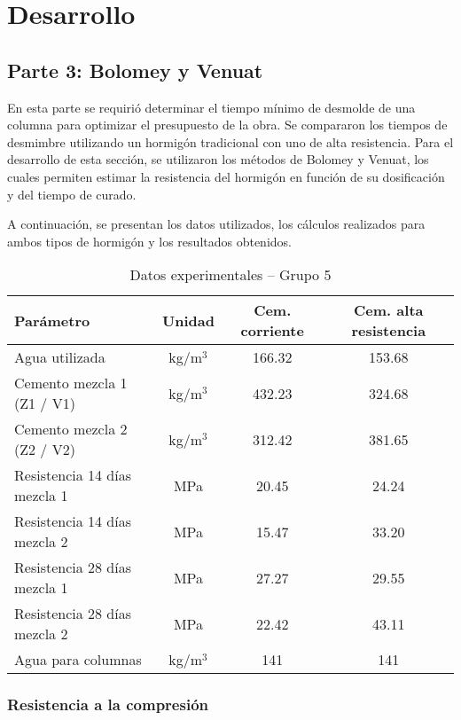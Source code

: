\section{Desarrollo}

\subsection{Parte 3: Bolomey y Venuat}

En esta parte se requirió determinar el tiempo mínimo de desmolde de una columna para optimizar el presupuesto de la obra. Se compararon los tiempos de desmimbre utilizando un hormigón tradicional con uno de alta resistencia. 
Para el desarrollo de esta sección, se utilizaron los métodos de Bolomey y Venuat, los cuales permiten estimar la resistencia del hormigón en función de su dosificación y del tiempo de curado.

A continuación, se presentan los datos utilizados, los cálculos realizados para ambos tipos de hormigón y los resultados obtenidos.

\begin{table}[H]
\centering
\caption{Datos experimentales – Grupo 5}
\renewcommand{\arraystretch}{1.15}
\small
\begin{tabular}{lccc}
\hline
\textbf{Parámetro} & \textbf{Unidad} & \textbf{Cem. corriente} & \textbf{Cem. alta resistencia} \\ \hline
Agua utilizada & kg/m$^3$ & 166.32 & 153.68 \\
Cemento mezcla 1 (Z1 / V1) & kg/m$^3$ & 432.23 & 324.68 \\
Cemento mezcla 2 (Z2 / V2) & kg/m$^3$ & 312.42 & 381.65 \\
Resistencia 14 días mezcla 1 & MPa & 20.45 & 24.24 \\
Resistencia 14 días mezcla 2 & MPa & 15.47 & 33.20 \\
Resistencia 28 días mezcla 1 & MPa & 27.27 & 29.55 \\
Resistencia 28 días mezcla 2 & MPa & 22.42 & 43.11 \\
Agua para columnas & kg/m$^3$ & 141 & 141\\ \hline
\end{tabular}
\end{table}

\subsubsection{Resistencia a la compresión}

